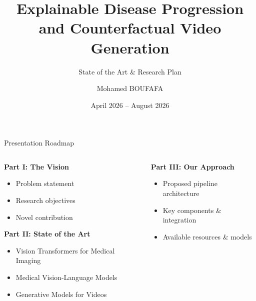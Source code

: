 \documentclass[aspectratio=169,xcolor=dvipsnames]{beamer}
\title{Explainable Disease Progression and Counterfactual Video Generation}
\subtitle{State of the Art \& Research Plan}
\author{Mohamed BOUFAFA }
\institute
{
    Mitacs Globalink Research Internship 2026 \\[0.3em]
    TÉLUQ University, Montreal, Canada \\[0.5em]
    \textbf{Supervisors:} \\
    Dr. Belkacem Chikhaoui (TÉLUQ) \\
    Dr. Belkacem Khaldi (Algeria)
}
\date{April 2026 -- August 2026}
\begin{document}
\begin{frame}
    \titlepage
\end{frame}

\begin{frame}{Presentation Roadmap}
    \begin{columns}[t]
        \begin{column}{0.48\textwidth}
            \begin{block}{\textbf{Part I: The Vision}}
                \begin{itemize}
                    \item Problem statement
                    \item Research objectives
                    \item Novel contribution
                \end{itemize}
            \end{block}
            
            \vspace{0.3em}
            
            \begin{block}{\textbf{Part II: State of the Art}}
                \begin{itemize}
                    \item Vision Transformers for Medical Imaging
                    \item Medical Vision-Language Models
                    \item Generative Models for Videos
                \end{itemize}
            \end{block}
        \end{column}
        
        \begin{column}{0.48\textwidth}
            \begin{block}{\textbf{Part III: Our Approach}}
                \begin{itemize}
                    \item Proposed pipeline architecture
                    \item Key components \& integration
                    \item Available resources \& models
                \end{itemize}
            \end{block}
            
            \vspace{0.3em}
            
        \end{column}
    \end{columns}
\end{frame}
\end{document}
